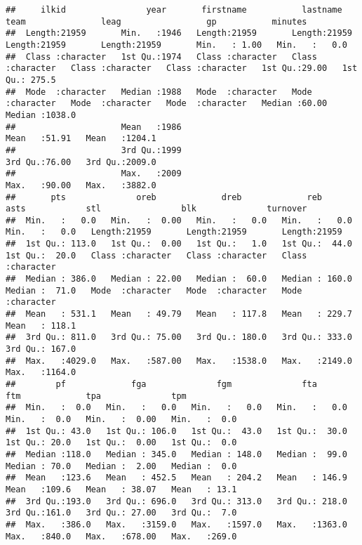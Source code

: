 \documentclass[
]{book}
\begin{document}
\begin{verbatim}
##     ilkid                year       firstname           lastname             team               leag                 gp           minutes      
##  Length:21959       Min.   :1946   Length:21959       Length:21959       Length:21959       Length:21959       Min.   : 1.00   Min.   :   0.0  
##  Class :character   1st Qu.:1974   Class :character   Class :character   Class :character   Class :character   1st Qu.:29.00   1st Qu.: 275.5  
##  Mode  :character   Median :1988   Mode  :character   Mode  :character   Mode  :character   Mode  :character   Median :60.00   Median :1038.0  
##                     Mean   :1986                                                                               Mean   :51.91   Mean   :1204.1  
##                     3rd Qu.:1999                                                                               3rd Qu.:76.00   3rd Qu.:2009.0  
##                     Max.   :2009                                                                               Max.   :90.00   Max.   :3882.0  
##       pts              oreb             dreb             reb              asts            stl                blk              turnover        
##  Min.   :   0.0   Min.   :  0.00   Min.   :   0.0   Min.   :   0.0   Min.   :   0.0   Length:21959       Length:21959       Length:21959      
##  1st Qu.: 113.0   1st Qu.:  0.00   1st Qu.:   1.0   1st Qu.:  44.0   1st Qu.:  20.0   Class :character   Class :character   Class :character  
##  Median : 386.0   Median : 22.00   Median :  60.0   Median : 160.0   Median :  71.0   Mode  :character   Mode  :character   Mode  :character  
##  Mean   : 531.1   Mean   : 49.79   Mean   : 117.8   Mean   : 229.7   Mean   : 118.1                                                           
##  3rd Qu.: 811.0   3rd Qu.: 75.00   3rd Qu.: 180.0   3rd Qu.: 333.0   3rd Qu.: 167.0                                                           
##  Max.   :4029.0   Max.   :587.00   Max.   :1538.0   Max.   :2149.0   Max.   :1164.0                                                           
##        pf             fga              fgm              fta              ftm             tpa              tpm       
##  Min.   :  0.0   Min.   :   0.0   Min.   :   0.0   Min.   :   0.0   Min.   :  0.0   Min.   :  0.00   Min.   :  0.0  
##  1st Qu.: 43.0   1st Qu.: 106.0   1st Qu.:  43.0   1st Qu.:  30.0   1st Qu.: 20.0   1st Qu.:  0.00   1st Qu.:  0.0  
##  Median :118.0   Median : 345.0   Median : 148.0   Median :  99.0   Median : 70.0   Median :  2.00   Median :  0.0  
##  Mean   :123.6   Mean   : 452.5   Mean   : 204.2   Mean   : 146.9   Mean   :109.6   Mean   : 38.07   Mean   : 13.1  
##  3rd Qu.:193.0   3rd Qu.: 696.0   3rd Qu.: 313.0   3rd Qu.: 218.0   3rd Qu.:161.0   3rd Qu.: 27.00   3rd Qu.:  7.0  
##  Max.   :386.0   Max.   :3159.0   Max.   :1597.0   Max.   :1363.0   Max.   :840.0   Max.   :678.00   Max.   :269.0
\end{verbatim}
\end{document}
